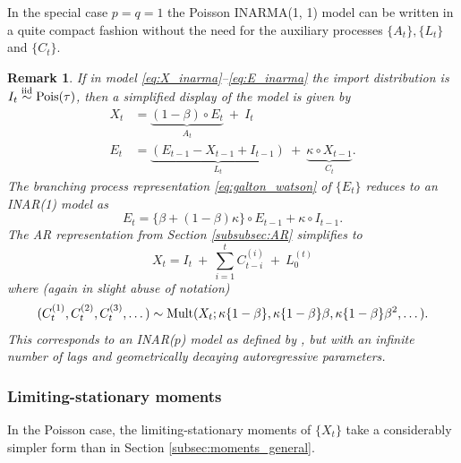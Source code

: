 \documentclass{article}
\newtheorem{remark}{Remark}
\begin{document}
In the special case $p = q = 1$ the Poisson INARMA(1, 1) model can be written in a quite compact fashion without the need for the auxiliary processes $\{A_t\}, \{L_t\}$ and $\{C_t\}$.%
\begin{remark}
If in model \eqref{eq:X_inarma}--\eqref{eq:E_inarma} the import distribution is $I_t \stackrel{\textnormal{iid}}{\sim} \textnormal{Pois}(\tau)$, then a simplified display of the model is given by
\begin{align}
X_t & = \underbrace{(1 - \beta) \circ E_t}_{A_t} \ + \ I_t \label{eq:inarma_poisson_simple_X}\\
E_t & = \underbrace{(E_{t - 1} - X_{t - 1} + I_{t - 1})}_{L_t} \ + \ \underbrace{\kappa \circ X_{t - 1}}_{C_t}\label{eq:inarma_poisson_simple_E}.
\end{align}
The branching process representation \eqref{eq:galton_watson} of $\{E_t\}$ reduces to an INAR(1) model as
\begin{equation}
E_t = \{\beta + (1 - \beta)\kappa\} \circ E_{t - 1} + \kappa \circ I_{t - 1}.\label{eq:E_INAR}
\end{equation}
The AR representation from Section \ref{subsubsec:AR} simplifies to
$$
X_t = I_t \ + \ \sum_{i  = 1}^t C_{t - i}^{(i)} \ + \ L_0^{(t)}
$$
where (again in slight abuse of notation)
\begin{align}
(C_t^{(1)}, C_t^{(2)}, C_t^{(3)}, \dots) \sim \textnormal{Mult}(X_{t}; \kappa\{1- \beta\}, \kappa\{1 - \beta\}\beta, \kappa\{1 - \beta\}\beta^2, \dots).\label{eq:ar_inf}
\end{align}
This corresponds to an INAR($p$) model as defined by \cite{Alzaid1990}, but with an infinite number of lags and geometrically decaying autoregressive parameters.
\end{remark}






\subsubsection{Limiting-stationary moments}

In the Poisson case, the limiting-stationary moments of $\{X_t\}$ take a considerably simpler form than in Section \ref{subsec:moments_general}.
\end{document}
